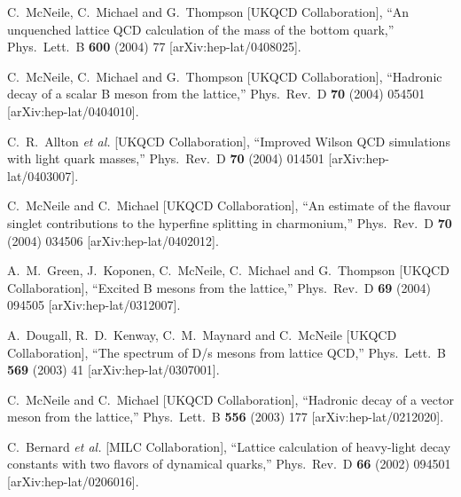 \begin{thebibliography}{130}
C.~McNeile, C.~Michael and G.~Thompson  [UKQCD Collaboration],
``An unquenched lattice QCD calculation of the mass of the bottom
quark,''
Phys.\ Lett.\ B {\bf 600} (2004) 77
[arXiv:hep-lat/0408025].


C.~McNeile, C.~Michael and G.~Thompson  [UKQCD Collaboration],
``Hadronic decay of a scalar B meson from the lattice,''
Phys.\ Rev.\ D {\bf 70} (2004) 054501
[arXiv:hep-lat/0404010].



C.~R.~Allton {\it et al.}  [UKQCD Collaboration],
``Improved Wilson QCD simulations with light quark masses,''
Phys.\ Rev.\ D {\bf 70} (2004) 014501
[arXiv:hep-lat/0403007].

C.~McNeile and C.~Michael  [UKQCD Collaboration],
``An estimate of the flavour singlet contributions to the hyperfine
splitting
in charmonium,''
Phys.\ Rev.\ D {\bf 70} (2004) 034506
[arXiv:hep-lat/0402012].



A.~M.~Green, J.~Koponen, C.~McNeile, C.~Michael and G.~Thompson
[UKQCD
                  Collaboration],
``Excited B mesons from the lattice,''
Phys.\ Rev.\ D {\bf 69} (2004) 094505
[arXiv:hep-lat/0312007].


A.~Dougall, R.~D.~Kenway, C.~M.~Maynard and C.~McNeile  [UKQCD
                  Collaboration],
``The spectrum of D/s mesons from lattice QCD,''
Phys.\ Lett.\ B {\bf 569} (2003) 41
[arXiv:hep-lat/0307001].


C.~McNeile and C.~Michael  [UKQCD Collaboration],
``Hadronic decay of a vector meson from the lattice,''
Phys.\ Lett.\ B {\bf 556} (2003) 177
[arXiv:hep-lat/0212020].


C.~Bernard {\it et al.}  [MILC Collaboration],
``Lattice calculation of heavy-light decay constants with two flavors
of  dynamical quarks,''
Phys.\ Rev.\ D {\bf 66} (2002) 094501
[arXiv:hep-lat/0206016].




\end{thebibliography}
